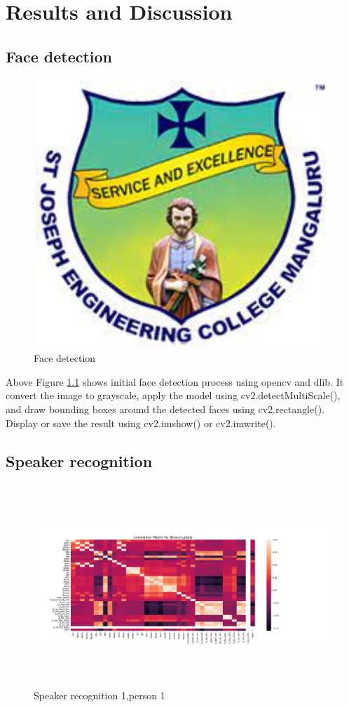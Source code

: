 \documentclass[12pt,a4paper]{report}
\begin{document}
\chapter{Results and Discussion}
\section{Face detection}
\begin{figure} [hbtp]
\centering
\includegraphics[width=5in,height=4in]{pic/sjeclogo.png}
\caption{Face detection}
\label{fig:pic5}
\end{figure}
\par Above Figure \ref{fig:pic5} shows initial face detection process using opencv and dlib. It convert the image to grayscale, apply the model using cv2.detectMultiScale(), and draw bounding boxes around the detected faces using cv2.rectangle(). Display or save the result using cv2.imshow() or cv2.imwrite().

\section{Speaker recognition}
\begin{figure} [hbtp]
\centering
\includegraphics[width=5in,height=3in]{pic/correlation_matrix_bin.png}
\caption{Speaker recognition 1,person 1}
\end{figure}
\end{document}
